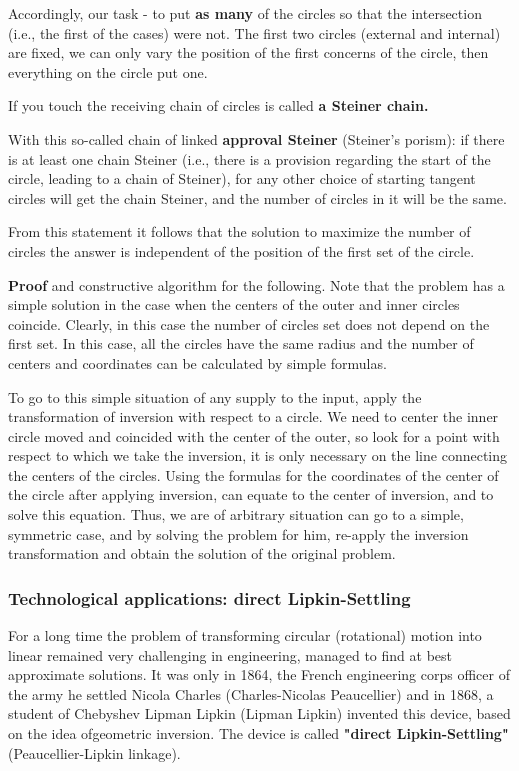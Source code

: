 Accordingly, our task - to put \textbf{as many} of the circles so that the intersection (i.e., the first of the cases) were not. The first two circles (external and internal) are fixed, we can only vary the position of the first concerns of the circle, then everything on the circle put one.

If you touch the receiving chain of circles is called \textbf{a Steiner chain.}

With this so-called chain of linked \textbf{approval Steiner} (Steiner's porism): if there is at least one chain Steiner (i.e., there is a provision regarding the start of the circle, leading to a chain of Steiner), for any other choice of starting tangent circles will get the chain Steiner, and the number of circles in it will be the same.

From this statement it follows that the solution to maximize the number of circles the answer is independent of the position of the first set of the circle.

\textbf{Proof} and constructive algorithm for the following. Note that the problem has a simple solution in the case when the centers of the outer and inner circles coincide. Clearly, in this case the number of circles set does not depend on the first set. In this case, all the circles have the same radius and the number of centers and coordinates can be calculated by simple formulas.

To go to this simple situation of any supply to the input, apply the transformation of inversion with respect to a circle. We need to center the inner circle moved and coincided with the center of the outer, so look for a point with respect to which we take the inversion, it is only necessary on the line connecting the centers of the circles. Using the formulas for the coordinates of the center of the circle after applying inversion, can equate to the center of inversion, and to solve this equation. Thus, we are of arbitrary situation can go to a simple, symmetric case, and by solving the problem for him, re-apply the inversion transformation and obtain the solution of the original problem.

\subsubsection{ Technological applications: direct Lipkin-Settling }

For a long time the problem of transforming circular (rotational) motion into linear remained very challenging in engineering, managed to find at best approximate solutions. It was only in 1864, the French engineering corps officer of the army he settled Nicola Charles (Charles-Nicolas Peaucellier) and in 1868, a student of Chebyshev Lipman Lipkin (Lipman Lipkin) invented this device, based on the idea of ​​geometric inversion. The device is called \textbf{"direct Lipkin-Settling"} (Peaucellier-Lipkin linkage).

